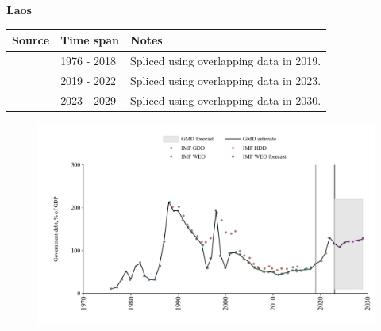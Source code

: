 \documentclass[12pt,a4paper,landscape]{article}
\begin{document}
\begin{adjustbox}{max totalsize={\paperwidth}{\paperheight},center}
\begin{minipage}[t][\textheight][t]{\textwidth}
\vspace*{0.5cm}
{}
\begin{center}
{\Large\bfseries Laos}
\end{center}
\vspace{0.5cm}
\begin{table}[H]
\centering
\small
\begin{tabular}{|l|l|l|}
\hline
\textbf{Source} & \textbf{Time span} & \textbf{Notes} \\
\hline
\rowcolor{white}\cite{IMF_GDD}& 1976 - 2018 &Spliced using overlapping data in 2019.\\
\rowcolor{lightgray}\cite{IMF_WEO}& 2019 - 2022 &Spliced using overlapping data in 2023.\\
\rowcolor{white}\cite{IMF_WEO_forecast}& 2023 - 2029 &Spliced using overlapping data in 2030.\\
\hline
\end{tabular}
\end{table}
\begin{figure}[H]
\centering
\includegraphics[width=\textwidth,height=0.6\textheight,keepaspectratio]{graphs/LAO_govdebt_GDP.pdf}
\end{figure}
\end{minipage}
\end{adjustbox}
\end{document}

